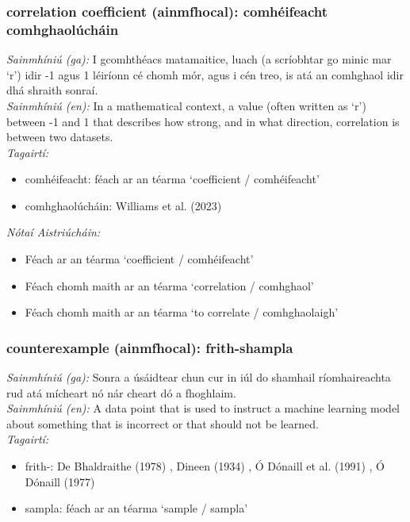 \subsubsection*{correlation coefficient (ainmfhocal): comhéifeacht comhghaolúcháin}
 \noindent \textit{Sainmhíniú (ga):} I gcomhthéacs matamaitice, luach (a scríobhtar go minic mar `r') idir -1 agus 1 léiríonn cé chomh mór, agus i cén treo, is atá an comhghaol idir dhá shraith sonraí.
\\
 \noindent \textit{Sainmhíniú (en):} In a mathematical context, a value (often written as `r') between -1 and 1 that describes how strong, and in what direction, correlation is between two datasets.
\\
 \noindent \textit{Tagairtí:}
\begin{itemize}
	\item comhéifeacht: féach ar an téarma `coefficient / comhéifeacht'
	\item comhghaolúcháin: Williams et al. (2023) \cite{storchiste}
\end{itemize}

 \noindent \textit{Nótaí Aistriúcháin:}
\begin{itemize}
	\item Féach ar an téarma `coefficient / comhéifeacht'
	\item Féach chomh maith ar an téarma `correlation / comhghaol'
	\item Féach chomh maith ar an téarma `to correlate / comhghaolaigh'
\end{itemize}


\subsubsection*{counterexample (ainmfhocal): frith-shampla}
 \noindent \textit{Sainmhíniú (ga):} Sonra a úsáidtear chun cur in iúl do shamhail ríomhaireachta rud atá mícheart nó nár cheart dó a fhoghlaim.
\\
 \noindent \textit{Sainmhíniú (en):} A data point that is used to instruct a machine learning model about something that is incorrect or that should not be learned.
\\
 \noindent \textit{Tagairtí:}
\begin{itemize}
	\item frith-: De Bhaldraithe (1978) \cite{de-bhaldraithe}, Dineen (1934) \cite{dineen}, Ó Dónaill et al. (1991) \cite{focloir-beag}, Ó Dónaill (1977) \cite{odonaill}
	\item sampla: féach ar an téarma `sample / sampla'
\end{itemize}

